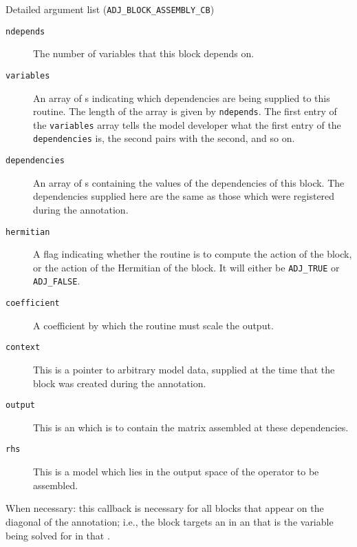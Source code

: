 \begin{boxwithtitle}{Detailed argument list (\texttt{ADJ_BLOCK_ASSEMBLY_CB})}
\begin{description}
\item[\texttt{ndepends}] The number of variables that this block depends on.
\item[\texttt{variables}] An array of s indicating which dependencies are being supplied to this routine. The length of the
array is given by \texttt{ndepends}. The first entry of the \texttt{variables} array
tells the model developer what the first entry of the \texttt{dependencies} is, the second pairs with the second, and so on.
\item[\texttt{dependencies}] An array of s containing the values of the dependencies of this block. The dependencies supplied
here are the same as those which were registered during the annotation.
\item[\texttt{hermitian}] A flag indicating whether the routine is to compute the action of the block, or the action of the Hermitian of the
block. It will either be \texttt{ADJ_TRUE} or \texttt{ADJ_FALSE}.
\item[\texttt{coefficient}] A coefficient by which the routine must scale the output.
\item[\texttt{context}] This is a pointer to arbitrary model data, supplied at the time that the block was created during the annotation.
\item[\texttt{output}] This is an  which is to contain the matrix assembled at these dependencies.
\item[\texttt{rhs}] This is a model  which lies in the output space of the operator to be assembled. 
\end{description}
\end{boxwithtitle}

When necessary: this callback is necessary for all blocks that appear on the diagonal of the annotation; i.e., the block
targets an  in an  that is the variable being solved for in that
.


